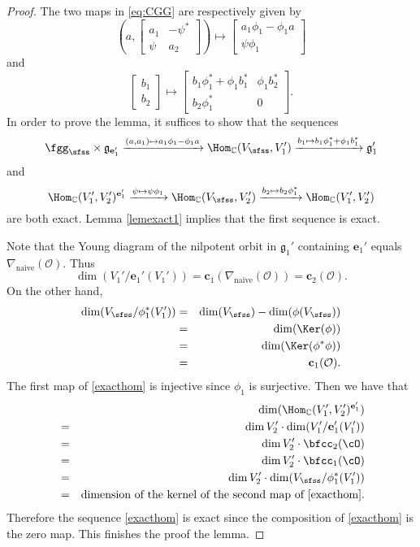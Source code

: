 \documentclass[12pt,a4paper]{amsart}
\newcommand{\CO}{{\mathcal {O}}}
\newcommand{\g}{\mathfrak g}
\newcommand{\be}{\begin {equation}}
\newcommand{\ee}{\end {equation}}
\numberwithin{equation}{section}
\theoremstyle{remark}
\begin{document}
\begin{proof}
The two maps in \eqref{eq:CGG} are respectively given by
\[
  \left(a, \begin{bmatrix}
        a_1 & -\psi^*\\
        \psi & a_2
      \end{bmatrix}\right)\mapsto   \begin{bmatrix}
        a_1 \phi_1-\phi_1 a\\
        \psi \phi_1
      \end{bmatrix}
\]
and
\[
  \begin{bmatrix}
       b_1\\
       b_2
      \end{bmatrix}\mapsto   \begin{bmatrix}
       b_1 \phi_1^*+\phi_1 b_1^*  & \phi_1 b_2^*\\
        b_2 \phi_1^* & 0
      \end{bmatrix}.
\]
In order to prove the lemma, it suffices to show that the sequences 
 \[
  \fggs\times  \g_{\mathbf e_1'} \xrightarrow{(a,a_1)\mapsto  a_1 \phi_1-\phi_1 a } \Hom_\C(V_\sfss, V_1')
  \xrightarrow{b_1\mapsto  b_1\phi_1^{*}+\phi_1 b_1^{*} } \g_1'
  \]
and 
\be\label{exacthom}
  \Hom_\C(V_1', V_2')^{\mathbf e_1'} \xrightarrow{\psi \mapsto  \psi \phi_1 } \Hom_\C(V_\sfss, V_2')
  \xrightarrow{b_2\mapsto  b_2\phi_1^{*}}  \Hom_\C(V_1', V_2') 
\ee
are both exact. Lemma \ref{lemexact1} implies that the first sequence is exact. 

Note that the Young diagram of the nilpotent orbit in $\g_1'$ containing $\mathbf e_1'$ equals $\nabla_{\mathrm{naive}}(\CO)$. Thus 
\[
  \dim (V_1'/\mathbf e_1'(V_1'))=\mathbf c_1(\nabla_{\mathrm{naive}}(\CO))=\mathbf c_2(\CO). 
\]
On the other hand, 
\begin{eqnarray*}
  \dim (V_{\sfss}/\phi_1^*(V_1'))&=&\dim (V_{\sfss})-\dim (\phi(V_{\sfss}))\\
  &=&\dim(\Ker(\phi))\\
  &=&\dim(\Ker(\phi^*\phi))\\
  &=&\mathbf c_1(\CO). 
\end{eqnarray*}
The first map of \eqref{exacthom} is injective since $\phi_1$ is surjective. Then we have that  
\begin{eqnarray*}
     && \dim ( \Hom_\C(V_1', V_2')^{\mathbf e_1'} ) \\
      &=& \dim V_2' \cdot \dim (V_1'/\mathbf e_1'(V_1'))\\
      & = &\dim V_2' \cdot  \bfcc_{2}(\cO)\\
      & = &\dim V_2' \cdot  \bfcc_{1}(\cO)\\ 
        & = &\dim V_2' \cdot  \dim (V_{\sfss}/\phi_1^*(V_1'))\\ 
        &=& \textrm{dimension of the kernel of the second map of  \eqref{exacthom}}.
    \end{eqnarray*}
Therefore the sequence \eqref{exacthom} is exact since the composition of  \eqref{exacthom} is the zero map. This finishes the proof the lemma. 

\end{proof}
\end{document}
